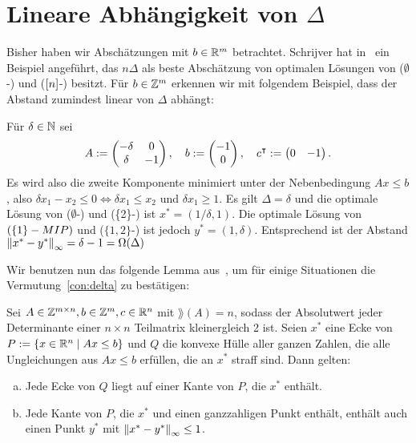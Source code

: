 \section{Lineare Abhängigkeit von $\Delta$}\label{sec:linear}

Bisher haben wir Abschätzungen mit $b\in\mathbb{R}^m$ betrachtet.
Schrijver hat in~\cite[Kapitel~17.2]{Schrijver1986} ein Beispiel angeführt, das $n\Delta$ als beste Abschätzung von optimalen Lösungen von ($\emptyset$-\MIPR) und ($[n]$-\MIPR) besitzt.
Für $b\in\mathbb{Z}^m$ erkennen wir mit folgendem Beispiel, dass der Abstand zumindest linear von $\Delta$ abhängt:
\begin{example}
	Für $\delta\in\mathbb{N}$ sei
	$$A:=
	\begin{pmatrix}
	-\delta & 0  \\
	\delta  & -1
	\end{pmatrix},\quad
	b:=\begin{pmatrix} -1 \\ 0 \end{pmatrix},\quad
	c^\intercal:=\begin{pmatrix}0 & -1\end{pmatrix}.
	$$
	Es wird also die zweite Komponente minimiert unter der Nebenbedingung $Ax\leq b$, also $\delta x_1-x_2\leq0\Leftrightarrow\delta x_1\leq x_2$ und $\delta x_1\geq 1$.
	Es gilt $\Delta=\delta$ und die optimale Lösung von ($\emptyset$-\MIPI) und (\{2\}-\MIPI) ist $x^*=(1/\delta,1)$.
	Die optimale Lösung von $(\{1\}-MIP)$ und ($\{1, 2\}$-\MIPI) ist jedoch $y^*=(1,\delta)$.
	Entsprechend ist der Abstand $\left\lVert x^*-y^*\right\rVert_\infty=\delta-1=\Omega(\Delta)$
\end{example}

Wir benutzen nun das folgende Lemma aus~\cite[Theorem 2 und Beweis]{VESELOV2009220}, um für einige Situationen die Vermutung~\ref{con:delta} zu bestätigen:
\begin{lemma}\label{lem:veselov}
	Sei $A\in\mathbb{Z}^{m\times n},b\in\mathbb{Z}^m,c\in\mathbb{R}^n$ mit $\rang(A)=n$, sodass der Absolutwert jeder Determinante einer $n\times n$ Teilmatrix kleinergleich 2 ist.
	Seien $x^*$ eine Ecke von $P:=\{x\in\mathbb{R}^n\mid Ax\leq b \}$ und $Q$ die konvexe Hülle aller ganzen Zahlen, die alle Ungleichungen aus $Ax\leq b$ erfüllen, die an $x^*$ straff sind.
	Dann gelten:
	\begin{enumerate}[(a)]
		\item Jede Ecke von $Q$ liegt auf einer Kante von $P$, die $x^*$ enthält.
		\item Jede Kante von $P$, die $x^*$ und einen ganzzahligen Punkt enthält, enthält auch einen Punkt $y^*$ mit $\left\lVert x^* -y^*\right\rVert_\infty\leq 1$.
	\end{enumerate}
\end{lemma}

